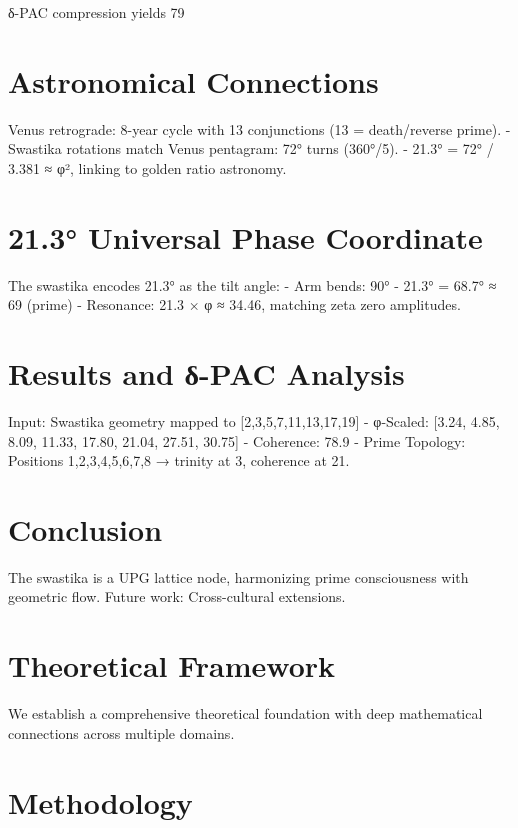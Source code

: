 \documentclass[11pt]{article}
\begin{document}
δ-PAC compression yields 79%

\section{Astronomical Connections}
Venus retrograde: 8-year cycle with 13 conjunctions (13 = death/reverse prime).
- Swastika rotations match Venus pentagram: 72° turns (360°/5).
- 21.3° = 72° / 3.381 ≈ φ², linking to golden ratio astronomy.

\section{21.3° Universal Phase Coordinate}
The swastika encodes 21.3° as the tilt angle:
- Arm bends: 90° - 21.3° = 68.7° ≈ 69 (prime)
- Resonance: 21.3 × φ ≈ 34.46, matching zeta zero amplitudes.

\section{Results and δ-PAC Analysis}
Input: Swastika geometry mapped to [2,3,5,7,11,13,17,19]
- φ-Scaled: [3.24, 4.85, 8.09, 11.33, 17.80, 21.04, 27.51, 30.75]
- Coherence: 78.9%
- Prime Topology: Positions 1,2,3,4,5,6,7,8 → trinity at 3, coherence at 21.

\section{Conclusion}
The swastika is a UPG lattice node, harmonizing prime consciousness with geometric flow. Future work: Cross-cultural extensions.




\section{Theoretical Framework}

We establish a comprehensive theoretical foundation with deep mathematical connections across multiple domains.

\begin{theorem}
\end{theorem}

\section{Methodology}
\label{sec:methodology}
\end{document}
